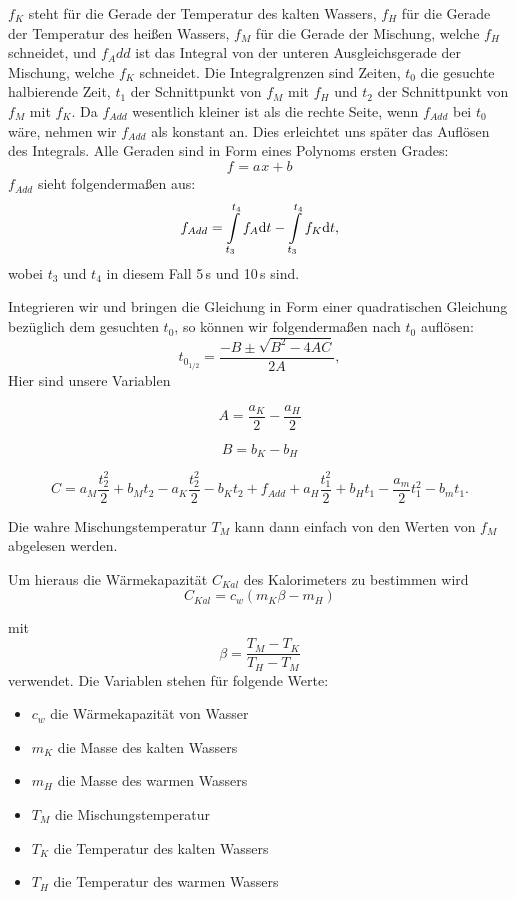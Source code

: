 \documentclass[11pt,a4paper]{article}
\begin{document}
$f_K$ steht f\"ur die Gerade der Temperatur des kalten Wassers, $f_H$ f\"ur die Gerade der Temperatur des hei\ss en Wassers, $f_M$ f\"ur die Gerade der Mischung, welche $f_H$ schneidet, und $f_Add$ ist das Integral von der unteren Ausgleichsgerade der Mischung, welche $f_K$ schneidet. Die Integralgrenzen sind Zeiten, $t_0$ die gesuchte halbierende Zeit, $t_1$ der Schnittpunkt von $f_M$ mit $f_H$ und $t_2$ der Schnittpunkt von $f_M$ mit $f_K$. Da $f_{Add}$ wesentlich kleiner ist als die rechte Seite, wenn $f_{Add}$ bei $t_0$ w\"are, nehmen wir $f_{Add}$ als konstant an. Dies erleichtet uns sp\"ater das Aufl\"osen des Integrals. Alle Geraden sind in Form eines Polynoms ersten Grades:
\begin{equation}
f_{}=a_{}x+b_{}\label{poly1deg}
\end{equation}
$f_{Add}$ sieht folgenderma\ss en aus:
\begin{equation}
f_{Add}=\int\displaylimits_{t_{3}}^{t_4}f_A\mathrm{d}t-\int\displaylimits_{t_{3}}^{t_4}f_K\mathrm{d}t,
\end{equation}
wobei $t_3$ und $t_4$ in diesem Fall 5\,s und 10\,s sind.

Integrieren wir und bringen die Gleichung in Form einer quadratischen Gleichung bez\"uglich dem gesuchten $t_0$, so k\"onnen wir folgenderma\ss en nach $t_0$ aufl\"osen:
\begin{equation}
t_{0_{1/2}}=\frac{-B\pm\sqrt{B^2-4AC}}{2A},\label{abc1}
\end{equation}
Hier sind unsere Variablen

\[
A=\frac{a_K}{2}-\frac{a_H}{2}
\]

\[
B=b_K-b_H
\]

\[
C=a_M\frac{t_2^2}{2}+b_Mt_2-a_K\frac{t_2^2}{2}-b_Kt_2+f_{Add}+a_H\frac{t_1^2}{2}+b_Ht_1-\frac{a_m}{2}t_1^2-b_mt_1.
\]

Die wahre Mischungstemperatur $T_M$ kann dann einfach von den Werten von $f_M$ abgelesen werden.

Um hieraus die W\"armekapazit\"at $C_{Kal}$ des Kalorimeters zu bestimmen wird
\begin{equation}
C_{Kal}=c_w(m_K\beta-m_H)\label{ck1}
\end{equation}

mit 
\[
\beta=\frac{T_M-T_K}{T_H-T_M}
\]
verwendet. Die Variablen stehen f\"ur folgende Werte:
\begin{itemize}
\item{$c_w$ die W\"armekapazit\"at von Wasser}
\item{$m_K$ die Masse des kalten Wassers}
\item{$m_H$ die Masse des warmen Wassers}
\item{$T_M$ die Mischungstemperatur}
\item{$T_K$ die Temperatur des kalten Wassers}
\item{$T_H$ die Temperatur des warmen Wassers}
\end{itemize}
\end{document}
